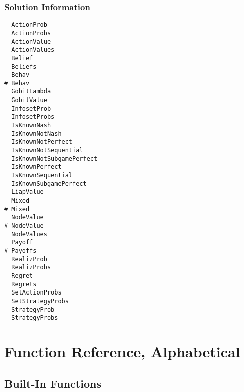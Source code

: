 \subsection{Solution Information}

\begin{multicols}{3}
\begin{verbatim}
  ActionProb 
  ActionProbs 
  ActionValue 
  ActionValues 
  Belief 
  Beliefs 
  Behav 
# Behav 
  GobitLambda 
  GobitValue 
  InfosetProb 
  InfosetProbs 
  IsKnownNash 
  IsKnownNotNash 
  IsKnownNotPerfect 
  IsKnownNotSequential 
  IsKnownNotSubgamePerfect 
  IsKnownPerfect 
  IsKnownSequential 
  IsKnownSubgamePerfect 
  LiapValue 
  Mixed
# Mixed
  NodeValue 
# NodeValue 
  NodeValues 
  Payoff 
# Payoffs 
  RealizProb 
  RealizProbs 
  Regret
  Regrets
  SetActionProbs 
  SetStrategyProbs 
  StrategyProb 
  StrategyProbs 
\end{verbatim}
\end{multicols}

\chapter{Function Reference, Alphabetical}
\pagestyle{lexicon}

\section{Built-In Functions}

